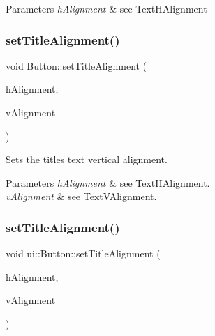 \begin{DoxyParams}{Parameters}
{\em h\+Alignment} & see Text\+H\+Alignment \\
\hline
\end{DoxyParams}
\mbox{\label{classui_1_1Button_a301e9a57fb9a01b1bc39be603a2e71d6}} 
\subsubsection{\texorpdfstring{set\+Title\+Alignment()}{setTitleAlignment()}\hspace{0.1cm}{\footnotesize\ttfamily [3/4]}}
{\footnotesize\ttfamily void Button\+::set\+Title\+Alignment (\begin{DoxyParamCaption}\item[{Text\+H\+Alignment}]{h\+Alignment,  }\item[{Text\+V\+Alignment}]{v\+Alignment }\end{DoxyParamCaption})}

Sets the title\textquotesingle{}s text vertical alignment.


\begin{DoxyParams}{Parameters}
{\em h\+Alignment} & see Text\+H\+Alignment. \\
\hline
{\em v\+Alignment} & see Text\+V\+Alignment. \\
\hline
\end{DoxyParams}
\mbox{\label{classui_1_1Button_a3934c4f1584202d1716382fdf0c1edf1}} 
\subsubsection{\texorpdfstring{set\+Title\+Alignment()}{setTitleAlignment()}\hspace{0.1cm}{\footnotesize\ttfamily [4/4]}}
{\footnotesize\ttfamily void ui\+::\+Button\+::set\+Title\+Alignment (\begin{DoxyParamCaption}\item[{Text\+H\+Alignment}]{h\+Alignment,  }\item[{Text\+V\+Alignment}]{v\+Alignment }\end{DoxyParamCaption})}

